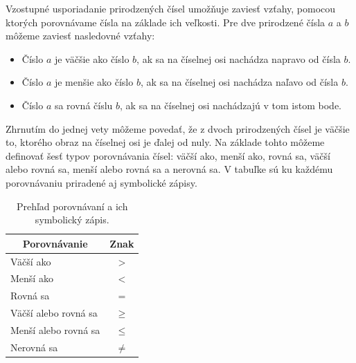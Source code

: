 \documentclass{article}
\begin{document}
Vzostupné usporiadanie prirodzených čísel umožňuje zaviesť vzťahy, pomocou ktorých porovnávame čísla na základe ich veľkosti. Pre dve prirodzené čísla \(a\) a \(b\) môžeme zaviesť nasledovné vzťahy:
\begin{itemize}
  \item Číslo \(a\) je väčšie ako číslo \(b\), ak sa na číselnej osi nachádza napravo od čísla \(b\).
  \item Číslo \(a\) je menšie ako číslo \(b\), ak sa na číselnej osi nachádza naľavo od čísla \(b\).
  \item Číslo \(a\) sa rovná číslu \(b\), ak sa na číselnej osi nachádzajú v tom istom bode.
\end{itemize}
Zhrnutím do jednej vety môžeme povedať, že z dvoch prirodzených čísel je väčšie to, ktorého obraz na číselnej osi je ďalej od nuly. Na základe tohto môžeme definovať šesť typov porovnávania čísel: väčší ako, menší ako, rovná sa, väčší alebo rovná sa, menší alebo rovná sa a nerovná sa. V tabuľke sú ku každému porovnávaniu priradené aj symbolické zápisy.

\begin{table}[H]
  \centering
  \renewcommand{\arraystretch}{1.3}
  \begin{tabular}{|l|c|}
    \hline
    \multicolumn{1}{|c|}{Porovnávanie} &
    \multicolumn{1}{c|}{Znak} \\
    \hline
    Väčší ako & \(>\) \\
    Menší ako & \(<\) \\
    Rovná sa & \(=\) \\
    Väčší alebo rovná sa & \(\geq\) \\
    Menší alebo rovná sa & \(\leq\) \\
    Nerovná sa & \(\neq\) \\
    \hline
  \end{tabular}
  \caption{Prehľad porovnávaní a ich symbolický zápis.}
\end{table}
\end{document}
